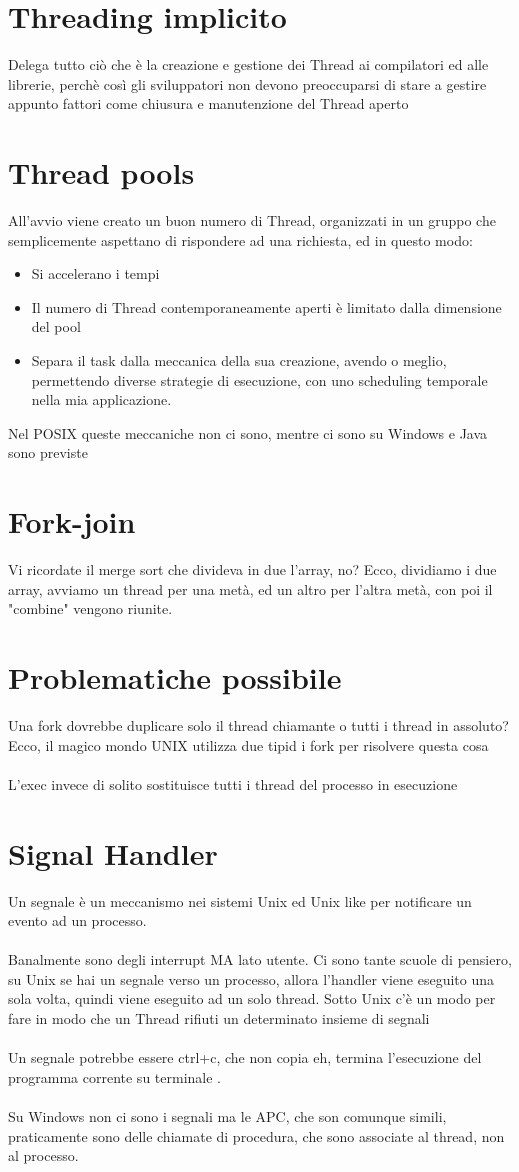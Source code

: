 \documentclass[12pt, a4paper, openany, twoside]{book}
\begin{document}
\section{Threading implicito}
Delega tutto ciò che è la creazione e gestione dei Thread ai compilatori ed 
alle librerie, perchè così gli sviluppatori non devono preoccuparsi di stare
a gestire appunto fattori come chiusura e manutenzione del Thread aperto
\section{Thread pools}
All'avvio viene creato un buon numero di Thread, organizzati in un gruppo che 
semplicemente aspettano di rispondere ad una richiesta, ed in questo modo:
\begin{itemize}
	\item Si accelerano i tempi
	\item Il numero di Thread contemporaneamente aperti è limitato dalla dimensione
	del pool
	\item Separa il task dalla meccanica della sua creazione, avendo o meglio,
	permettendo diverse strategie di esecuzione, con uno scheduling temporale
	nella mia applicazione.
\end{itemize}
Nel POSIX queste meccaniche non ci sono, mentre ci sono su Windows e Java sono
previste
\section{Fork-join}
Vi ricordate il merge sort che divideva in due l'array, no? Ecco, dividiamo
i due array, avviamo un thread per una metà, ed un altro per l'altra metà,
con poi il "combine" vengono riunite.
\section{Problematiche possibile}
Una fork dovrebbe duplicare solo il thread chiamante o tutti i thread in assoluto?
Ecco, il magico mondo UNIX utilizza due tipid i fork per risolvere questa cosa\\ \\
L'exec invece di solito sostituisce tutti i thread del processo
in esecuzione
\section{Signal Handler}
Un segnale è un meccanismo nei sistemi Unix ed Unix like per notificare un evento
ad un processo. \\ \\
Banalmente sono degli interrupt MA lato utente. Ci sono tante scuole di pensiero,
su Unix se hai un segnale verso un processo, allora l'handler viene eseguito
una sola volta, quindi viene eseguito ad un solo thread. Sotto Unix c'è un modo
per fare in modo che un Thread rifiuti un determinato insieme di segnali\\ \\
Un segnale potrebbe essere ctrl+c, che non copia eh, termina l'esecuzione del
programma corrente su terminale .\\ \\
Su Windows non ci sono i segnali ma le APC, che son comunque simili, praticamente
sono delle chiamate di procedura, che sono associate al thread, non al processo.
\end{document}
